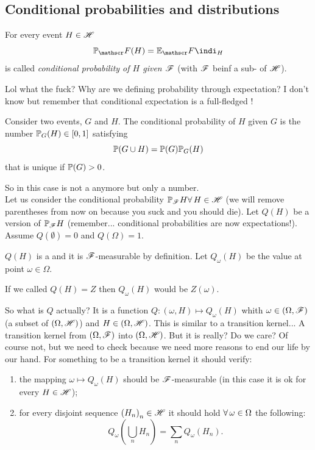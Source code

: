 \documentclass{report}
\begin{document}
\subsection{Conditional probabilities and distributions}
\begin{definition}
	For every event $H\in\mathscr{H}$
	\[\pr_\F(H)=\ev_\F\indi_H\]
	is called \emph{conditional probability of $H$ given $\mathscr{F}$} (with $\mathscr{F}$ beinf a sub-\sa{} of $\mathscr{H}$).
\end{definition}
Lol what the fuck? Why are we defining probability through expectation? I don't know but remember that conditional expectation is a full-fledged \rv{}!
\begin{definition}
	Consider two events, $G$ and $H$. The conditional probability of $H$ given $G$ is the number $\mathbb{P}_G(H)\in[0,1]$ satisfying
	\[\mathbb{P}(G\cup H)=\mathbb{P}(G)\mathbb{P}_{G}(H)\]
	that is unique if $\mathbb{P}(G)>0$.
\end{definition}
So in this case is not a \rv{} anymore but only a number.\\
Let us consider the conditional probability $\mathbb{P}_{\mathscr{F}} H\forall\, H\in\mathscr{H}$ (we will remove parentheses from now on because you suck and you should die). Let $Q(H)$ be a version of $\mathbb{P}_{\mathscr{F}} H$ (remember... conditional probabilities are now expectations!). Assume $Q(\emptyset)=0$ and $Q(\Omega)=1$.\par
$Q(H)$ is a \rv{} and it is $\mathscr{F}$-measurable by definition. Let $Q_\omega(H)$ be the value at point $\omega\in\Omega$. 
\begin{notation}
	If we called $Q(H)=Z$ then $Q_\omega(H)$ would be $Z(\omega)$.
\end{notation}
So what is $Q$ actually? It is a function $Q:(\omega, H)\mapsto Q_\omega(H)$ whith $\omega\in(\Omega,\mathscr{F})$ (a subset of $(\Omega, \mathscr{H})$) and $H\in(\Omega,\mathscr{H})$. This is similar to a transition kernel... A transition kernel from $(\Omega,\mathscr{F})$ into $(\Omega,\mathscr{H})$. But it is really? Do we care? Of course not, but we need to check because we need more reasons to end our life by our hand.
	For something to be a transition kernel it should verify:
	\begin{enumerate}
		\item the mapping $\omega\mapsto Q_\omega(H)$ should be $\mathscr{F}$-measurable (in this case it is ok for every $H\in\mathscr{H}$\checkmark);
		\item for every disjoint sequence ${(H_n)}_{n}\in\mathscr{H}$ it should hold $\forall\,\omega\in\Omega$ the following:
		\begin{equation}
			Q_\omega\left(\bigcup_n H_n\right)=\sum_n Q_\omega(H_{n})\tag{$\star$}\label{asfucked}.
		\end{equation}
	\end{enumerate}
\end{document}
